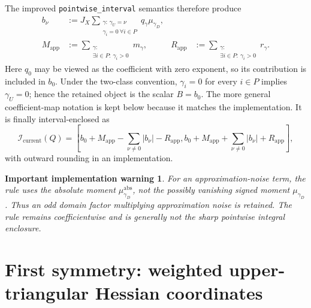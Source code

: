 \documentclass[11pt]{article}
\newtheorem{warning}{Important implementation warning}
\newcommand{\abs}[1]{\left\lvert #1\right\rvert}
\begin{document}
The improved \texttt{pointwise\_interval} semantics therefore produce
\begin{align}
    b_\nu
    &:=
    J_X
    \sum_{\substack{\gamma:\,\gamma_U=\nu\\
                    \gamma_i=0\ \forall i\in P}}
    q_\gamma\mu_{\gamma_D},
    \label{eq:retained-coefficients}\\
    M_{\mathrm{app}}
    &:=\sum_{\substack{\gamma:\\
                    \exists i\in P:\ \gamma_i>0}}m_\gamma,
    &
    R_{\mathrm{app}}
    &:=\sum_{\substack{\gamma:\\
                    \exists i\in P:\ \gamma_i>0}}r_\gamma.
    \label{eq:approximation-radius}
\end{align}
Here \(q_0\) may be viewed as the coefficient with zero exponent, so its
contribution is included in \(b_0\).  Under the two-class convention,
\(\gamma_i=0\) for every \(i\in P\) implies \(\gamma_U=0\); hence the
retained object is the scalar \(B=b_0\).  The more general coefficient-map
notation is kept below because it matches the implementation.
It is finally interval-enclosed as
\begin{equation}
    \boxed{
    \mathcal{I}_{\mathrm{current}}(Q)
    =
    \left[
        b_0+M_{\mathrm{app}}-\sum_{\nu\neq0}\abs{b_\nu}-R_{\mathrm{app}},
        b_0+M_{\mathrm{app}}+\sum_{\nu\neq0}\abs{b_\nu}+R_{\mathrm{app}}
    \right],
    }
    \label{eq:current-functional}
\end{equation}
with outward rounding in an implementation.

\begin{warning}
For an approximation-noise term, the rule uses the absolute moment
\(\mu^{\mathrm{abs}}_{\gamma_D}\), not the possibly vanishing signed moment
\(\mu_{\gamma_D}\).  Thus an odd domain factor multiplying approximation
noise is retained.  The rule remains coefficientwise and is generally not
the sharp pointwise integral enclosure.
\end{warning}

\section{First symmetry: weighted upper-triangular Hessian coordinates}
\end{document}
